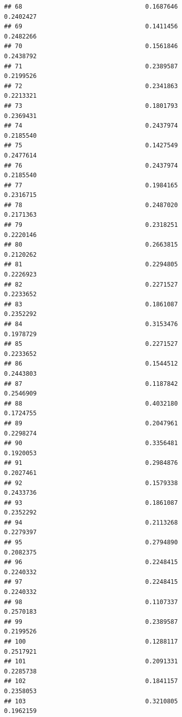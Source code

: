 \documentclass[
  american,
  man,floatsintext]{apa7}
\begin{document}
\begin{verbatim}
## 68                                  0.1687646               0.2402427
## 69                                  0.1411456               0.2482266
## 70                                  0.1561846               0.2438792
## 71                                  0.2389587               0.2199526
## 72                                  0.2341863               0.2213321
## 73                                  0.1801793               0.2369431
## 74                                  0.2437974               0.2185540
## 75                                  0.1427549               0.2477614
## 76                                  0.2437974               0.2185540
## 77                                  0.1984165               0.2316715
## 78                                  0.2487020               0.2171363
## 79                                  0.2318251               0.2220146
## 80                                  0.2663815               0.2120262
## 81                                  0.2294805               0.2226923
## 82                                  0.2271527               0.2233652
## 83                                  0.1861087               0.2352292
## 84                                  0.3153476               0.1978729
## 85                                  0.2271527               0.2233652
## 86                                  0.1544512               0.2443803
## 87                                  0.1187842               0.2546909
## 88                                  0.4032180               0.1724755
## 89                                  0.2047961               0.2298274
## 90                                  0.3356481               0.1920053
## 91                                  0.2984876               0.2027461
## 92                                  0.1579338               0.2433736
## 93                                  0.1861087               0.2352292
## 94                                  0.2113268               0.2279397
## 95                                  0.2794890               0.2082375
## 96                                  0.2248415               0.2240332
## 97                                  0.2248415               0.2240332
## 98                                  0.1107337               0.2570183
## 99                                  0.2389587               0.2199526
## 100                                 0.1288117               0.2517921
## 101                                 0.2091331               0.2285738
## 102                                 0.1841157               0.2358053
## 103                                 0.3210805               0.1962159

\end{verbatim}
\end{document}

